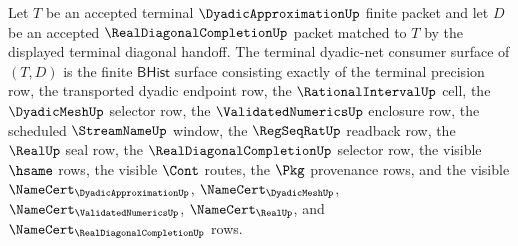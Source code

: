 \begin{definition}
\label{def:dyadicapproximation-terminal-dyadic-net-consumer-surface}
Let $T$ be an accepted terminal $\DyadicApproximationUp$ finite packet and let
$D$ be an accepted $\RealDiagonalCompletionUp$ packet matched to $T$ by the
displayed terminal diagonal handoff. The terminal dyadic-net consumer surface
of $(T,D)$ is the finite $\mathsf{BHist}$ surface consisting exactly of the
terminal precision row, the transported dyadic endpoint row, the
$\RationalIntervalUp$ cell, the $\DyadicMeshUp$ selector row, the
$\ValidatedNumericsUp$ enclosure row, the scheduled $\StreamNameUp$ window,
the $\RegSeqRatUp$ readback row, the $\RealUp$ seal row, the
$\RealDiagonalCompletionUp$ selector row, the visible $\hsame$ rows, the
visible $\Cont$ routes, the $\Pkg$ provenance rows, and the visible
$\NameCert_{\DyadicApproximationUp}$, $\NameCert_{\DyadicMeshUp}$,
$\NameCert_{\ValidatedNumericsUp}$, $\NameCert_{\RealUp}$, and
$\NameCert_{\RealDiagonalCompletionUp}$ rows.
\end{definition}

